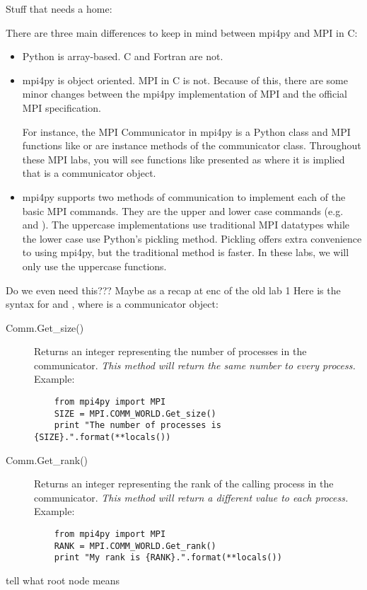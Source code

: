 Stuff that needs a home:

    There are three main differences to keep in mind between mpi4py and MPI in C:
    \begin{itemize}
        \item Python is array-based. C and Fortran are not.
        \item mpi4py is object oriented. MPI in C is not.
            Because of this, there are some minor changes between the mpi4py implementation of 
            MPI and the official MPI specification.

            For instance, the MPI Communicator in mpi4py is a Python class and MPI functions 
            like  or  are instance methods of the communicator class. 
            Throughout these MPI labs, you will see functions like  presented as 
             where it is implied that  is a communicator object.
        \item mpi4py supports two methods of communication to implement each of the basic MPI commands. 
            They are the upper and lower case commands (e.g.  and ). 
            The uppercase implementations use traditional MPI datatypes while the lower case use 
            Python's pickling method. Pickling offers extra convenience to using mpi4py, 
            but the traditional method is faster. In these labs, we will only use the uppercase functions.
    \end{itemize}

Do we even need this??? Maybe as a recap at enc of the old lab 1
    Here is the syntax for  and , where  is a communicator object:
    \begin{description}
    \item[Comm.Get\_size()]
    Returns an integer representing the number of processes in the communicator.
    \emph{This method will return the same number to every process.}
    Example:
    \begin{lstlisting}
    from mpi4py import MPI
    SIZE = MPI.COMM_WORLD.Get_size()
    print "The number of processes is {SIZE}.".format(**locals())
    \end{lstlisting}
    \item[Comm.Get\_rank()]
    Returns an integer representing the rank of the calling process in the communicator.
    \emph{This method will return a different value to each process.}
    Example:
    \begin{lstlisting}
    from mpi4py import MPI
    RANK = MPI.COMM_WORLD.Get_rank()
    print "My rank is {RANK}.".format(**locals())
    \end{lstlisting}
    \end{description}

tell what root node means
